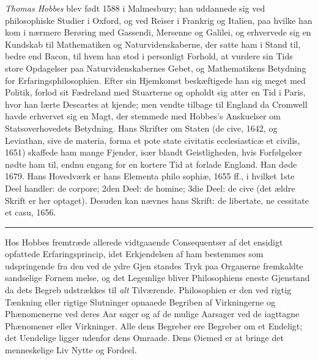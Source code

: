 \documentclass[12pt,a4paper]{book}
\newcommand{\divrule}{\begin{center}\rule{2cm}{0.4pt}\end{center}}
\begin{document}
\emph{Thomas Hobbes} blev født 1588 i Malmesbury; han
uddannede sig ved philosophiske Studier i Oxford, og ved
Reiser i Frankrig og Italien, paa hvilke han kom i nærmere
Berøring med Gassendi, Mersenne og Galilei, og erhvervede
sig en Kundskab til Mathematiken og Naturvidenskaberne, der
satte ham i Stand til, bedre end Bacon, til hvem han stod i
personligt Forhold, at vurdere sin Tids store Opdagelser paa
Naturvidenskabernes Gebet, og Mathematikens Betydning for
Erfaringsphilosophien. Efter sin Hjemkomst beskæftigede han
sig meget med Politik, forlod sit Fædreland med Stuarterne
og opholdt sig atter en Tid i Paris, hvor han lærte Descartes
at kjende; men vendte tilbage til England da Cromwell havde
erhvervet sig en Magt, der stemmede med Hobbes's Anskuelser
om Statsoverhovedets Betydning. Hans Skrifter om Staten
(de cive, 1642, og Leviathan, sive de materia, forma et pote\-%
state civitatis ecclesiasticæ et civilis, 1651) skaffede ham mange
Fjender, især blandt Geistligheden, hvis Forfølgelser nødte ham
til, endnu engang for en kortere Tid at forlade England.
Han døde 1679. Hans Hovedværk er hans Elementa philo\-%
sophiæ, 1655 ff., i hvilket 1ste Deel handler: de corpore; 2den
Deel: de homine; 3die Deel: de cive (det ældre Skrift er her
optaget). Desuden kan nævnes hans Skrift: de libertate, ne\-%
cessitate et casu, 1656.

\divrule

Hos Hobbes fremtræde allerede vidtgaaende Consequentser
af det ensidigt opfattede Erfaringsprincip, idet Erkjendelsen af
ham bestemmes som udspringende fra den ved de ydre Gjen\-%
standes Tryk paa Organerne fremkaldte sandselige Fornem\-%
melse, og det Legemlige bliver Philosophiens eneste Gjenstand
da dets Begreb udstrækkes til \emph{alt} Tilværende. Philosophien
er den ved rigtig Tænkning eller rigtige Slutninger opnaaede
Begriben af Virkningerne og Phænomenerne ved deres Aar\-%
sager og af de mulige Aarsager ved de iagttagne Phænomener
eller Virkninger. Alle dens Begreber ere Begreber om et
Endeligt; det Uendelige ligger udenfor dens Omraade. Dens
Øiemed er at bringe det menneskelige Liv Nytte og Fordeel.
\end{document}
